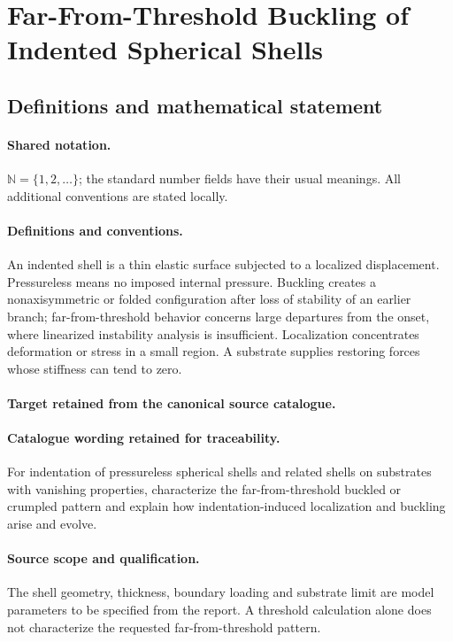 \documentclass[11pt]{article}
\begin{document}
\section{Far-From-Threshold Buckling of Indented Spherical Shells}\label{statement}

\subsection{Definitions and mathematical statement}

\paragraph{Shared notation.}$\mathbb N=\{1,2,\ldots\}$; the standard number fields have their usual meanings. All additional conventions are stated locally.


\paragraph{Definitions and conventions.}
An indented shell is a thin elastic surface subjected to a localized displacement. Pressureless means no imposed internal pressure. Buckling creates a nonaxisymmetric or folded configuration after loss of stability of an earlier branch; far-from-threshold behavior concerns large departures from the onset, where linearized instability analysis is insufficient. Localization concentrates deformation or stress in a small region. A substrate supplies restoring forces whose stiffness can tend to zero.

\paragraph{Target retained from the canonical source catalogue.}
\paragraph{Catalogue wording retained for traceability.}
For indentation of pressureless spherical shells and related shells on substrates with vanishing properties, characterize the far-from-threshold buckled or crumpled pattern and explain how indentation-induced localization and buckling arise and evolve.

\paragraph{Source scope and qualification.}
The shell geometry, thickness, boundary loading and substrate limit are model parameters to be specified from the report. A threshold calculation alone does not characterize the requested far-from-threshold pattern.
\end{document}
